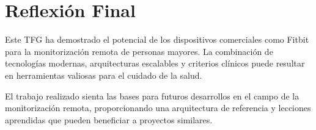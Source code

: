 \section{Reflexión Final}
\label{sec:reflexion_final}

Este TFG ha demostrado el potencial de los dispositivos comerciales como Fitbit\textsuperscript{\textregistered} para la monitorización remota de personas mayores. La combinación de tecnologías modernas, arquitecturas escalables y criterios clínicos puede resultar en herramientas valiosas para el cuidado de la salud.

El trabajo realizado sienta las bases para futuros desarrollos en el campo de la monitorización remota, proporcionando una arquitectura de referencia y lecciones aprendidas que pueden beneficiar a proyectos similares.
